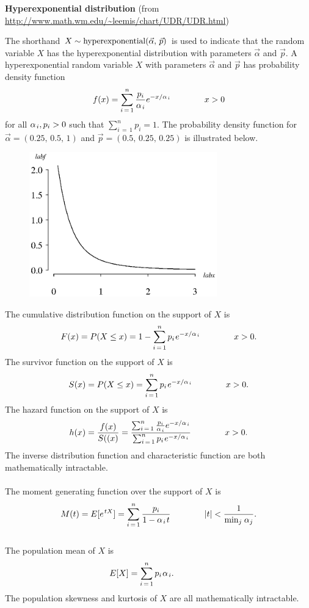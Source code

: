 \documentclass[12pt,fullpage]{article}
\begin{document}
\noindent
{\bf Hyperexponential distribution} (from \color{blue}\url{http://www.math.wm.edu/~leemis/chart/UDR/UDR.html}\color{black})

\noindent
The shorthand $X \sim {\rm hyperexponential}(\vec\alpha,\, \vec p)$ is used to indicate that the
random variable $X$ has the hyperexponential distribution with parameters $\vec\alpha$ and $\vec p$.
A hyperexponential random variable $X$ with parameters $\vec \alpha$ and $\vec p$ has probability density function 
$$
f(x) = \displaystyle\sum_{i \, = \, 1} ^ {n} \frac{p_i} {\alpha_{\kern 0.08 em i}} e ^ {-x / \alpha_{\kern 0.08 em i}} \qquad \qquad x > 0
$$
for all $\alpha_{\kern 0.08 em i}, p_i > 0$ such that $\sum_{i \, = \, 1} ^ n p_i = 1$.
The probability density function for $\vec \alpha = (0.25, \, 0.5, \, 1)$ and $\vec p = (0.5, \, 0.25, \, 0.25)$ is illustrated below.

\begin{figure}[h!]
\begin{center}
\includegraphics[width=3.2in]{HyperexponentialPlot.ps}
\end{center}
\end{figure}

\noindent
The cumulative distribution function on the support of $X$ is
$$
F(x) = P(X \leq x) = 1 - \displaystyle \sum_{i \, = \, 1} ^ {n} p_i \kern 0.08 em e ^ {-x / \alpha_{\kern 0.08 em i}} \qquad \qquad x > 0.
$$
The survivor function on the support of $X$ is
$$
S(x) = P(X \leq x) = \displaystyle \sum_{i \, = \, 1} ^ {n} p_i \kern 0.08 em e ^ {-x / \alpha_{\kern 0.08 em i}} \qquad \qquad x > 0.
$$
The hazard function on the support of $X$ is
$$
h(x) = \frac{f(x)}{S((x)} = \frac{\sum_{i \, = \, 1} ^ {n} \frac{p_i} {\alpha_{\kern 0.08 em i}} e ^ {-x / \alpha_{\kern 0.08 em i}} }
       {\sum_{i \, = \, 1} ^ {n} p_i \kern 0.08 em e ^ {-x / \alpha_{\kern 0.08 em i}}} \qquad \qquad x > 0.
$$
The inverse distribution function and characteristic function are both mathematically intractable. \\
\\
\noindent
The moment generating function over the support of $X$ is
$$
M(t) = E[e ^ {\kern 0.08 em tX}] = \displaystyle \sum_{i \, = \, 1} ^ n \frac{p_i} {1 - \alpha_{\kern 0.08 em i} \kern 0.08 em t} \qquad \qquad |t| < \frac{1}{\min_{j} \kern 0.08 em \alpha_j}.
$$
\\
The population mean of $X$ is
$$
E[X] = \displaystyle \sum_{i \, = \, 1} ^ n p_i \kern 0.08 em \alpha_{\kern 0.08 em i}. \qquad \qquad 
$$
The population skewness and kurtosis of $X$ are all mathematically intractable.
\end{document}
